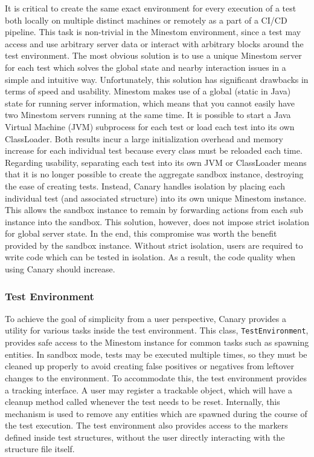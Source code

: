 \documentclass[12pt]{article}
\def\code#1{\texttt{#1}}
\begin{document}
\begin{onehalfspacing}
It is critical to create the same exact environment for every execution
of a test both locally on multiple distinct machines or remotely as a
part of a CI/CD pipeline. This task is non-trivial in the Minestom
environment, since a test may access and use arbitrary server data or
interact with arbitrary blocks around the test environment. The most
obvious solution is to use a unique Minestom server for each test which
solves the global state and nearby interaction issues in a simple and
intuitive way. Unfortunately, this solution has significant drawbacks in
terms of speed and usability. Minestom makes use of a global (static in
Java) state for running server information, which means that you cannot
easily have two Minestom servers running at the same time. It is
possible to start a Java Virtual Machine (JVM) subprocess for each test
or load each test into its own ClassLoader. Both results incur a large
initialization overhead and memory increase for each individual test
because every class must be reloaded each time. Regarding usability,
separating each test into its own JVM or ClassLoader means that it is no
longer possible to create the aggregate sandbox instance, destroying the
ease of creating tests. Instead, Canary handles isolation by placing
each individual test (and associated structure) into its own unique
Minestom instance. This allows the sandbox instance to remain by
forwarding actions from each sub instance into the sandbox. This
solution, however, does not impose strict isolation for global server
state. In the end, this compromise was worth the benefit provided by the
sandbox instance. Without strict isolation, users are required to write
code which can be tested in isolation. As a result, the code quality
when using Canary should increase.

\subsubsection{Test Environment}

To achieve the goal of simplicity from a user perspective, Canary
provides a utility for various tasks inside the test environment. This
class, \code{TestEnvironment}, provides safe access to the Minestom instance
for common tasks such as spawning entities. In sandbox mode, tests may
be executed multiple times, so they must be cleaned up properly to avoid
creating false positives or negatives from leftover changes to the
environment. To accommodate this, the test environment provides a
tracking interface. A user may register a trackable object, which will
have a cleanup method called whenever the test needs to be reset.
Internally, this mechanism is used to remove any entities which are
spawned during the course of the test execution. The test environment
also provides access to the markers defined inside test structures,
without the user directly interacting with the structure file itself.


\end{onehalfspacing}
\end{document}
